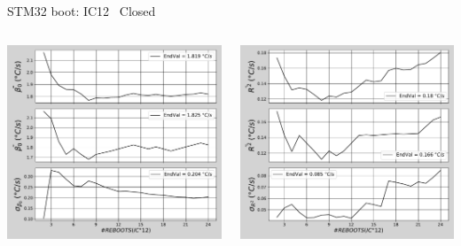 \begin{frame}{STM32 boot: IC12 \textrightarrow\ Closed}
	\vspace{5mm}
	\begin{columns}
		\begin{column}{0.5\textwidth}
			\includegraphics[width=1.0\textwidth]{./figures/flistCircuit12_25_sl30_2beta0.pdf}
		\end{column}
		\begin{column}{0.5\textwidth}
			\includegraphics[width=1.0\textwidth]{./figures/flistCircuit12_25_sl30_2r2.pdf}
		\end{column}
	\end{columns}
\end{frame}

